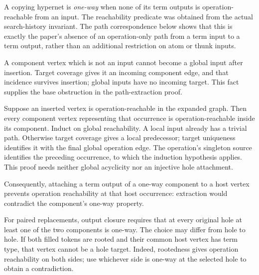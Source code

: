 A copying hypernet is \emph{one-way} when none of its term outputs is
operation-reachable from an input. The reachability predicate was obtained
from the actual search-history invariant. The path correspondence below
shows that this is exactly the paper's absence of an operation-only path
from a term input to a term output, rather than an additional restriction
on atom or thunk inputs.


A component vertex which is not an input cannot become a global input
after insertion. Target coverage gives it an incoming component edge, and
that incidence survives insertion; global inputs have no incoming target.
This fact supplies the base obstruction in the path-extraction proof.


Suppose an inserted vertex is operation-reachable in the expanded graph.
Then every component vertex representing that occurrence is operation-reachable
inside its component. Induct on global reachability. A local input already
has a trivial path. Otherwise target coverage gives a local predecessor;
target uniqueness identifies it with the final global operation edge.
The operation's singleton source identifies the preceding occurrence, to
which the induction hypothesis applies. This proof needs neither global
acyclicity nor an injective hole attachment.

Consequently, attaching a term output of a one-way component to a host
vertex prevents operation reachability at that host occurrence: extraction
would contradict the component's one-way property.



For paired replacements, output closure requires that at every original
hole at least one of the two components is one-way. The choice may differ
from hole to hole. If both filled tokens are rooted and their common host
vertex has term type, that vertex cannot be a hole target. Indeed, rootedness
gives operation reachability on both sides; use whichever side is one-way
at the selected hole to obtain a contradiction.



